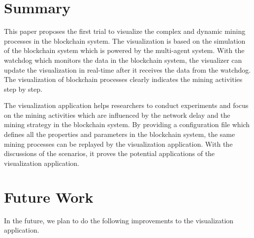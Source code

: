 \section{Summary}

This paper proposes the first trial to visualize the complex and dynamic mining processes in the blockchain system. The visualization is based on the simulation of the blockchain system which is powered by the multi-agent system. With the watchdog which monitors the data in the blockchain system, the visualizer can update the visualization in real-time after it receives the data from the watchdog. The visualization of blockchain processes clearly indicates the mining activities step by step. 

The visualization application helps researchers to conduct experiments and focus on the mining activities which are influenced by the network delay and the mining strategy in the blockchain system. By providing a configuration file which defines all the properties and parameters in the blockchain system, the same mining processes can be replayed by the visualization application. With the discussions of the scenarios, it proves the potential applications of the visualization application.

\section{Future Work}

In the future, we plan to do the following improvements to the visualization application.

